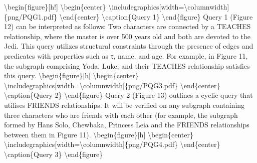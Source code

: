 \documentclass{article}%
\begin{document}
\textbackslash{}begin\{figure\}{[}h!{]}\newline%
\textbackslash{}begin\{center\}\newline%
\textbackslash{}includegraphics{[}width=\textbackslash{}columnwidth{]}\{png/PQG1.pdf\}\newline%
\textbackslash{}end\{center\}\newline%
\textbackslash{}caption\{Query 1\}\newline%
\textbackslash{}end\{figure\}\newline%
\newline%
Query 1 (Figure 12) can be interpreted as follows: Two characters are connected by a TEACHES relationship, where the master is over 500 years old and both are devoted to the Jedi. This query utilizes structural constraints through the presence of edges and predicates with properties such as τ, name, and age. For example, in Figure 11, the subgraph comprising Yoda, Luke, and their TEACHES relationship satisfies this query.\newline%
\newline%
\textbackslash{}begin\{figure\}{[}h{]}\newline%
\textbackslash{}begin\{center\}\newline%
\textbackslash{}includegraphics{[}width=\textbackslash{}columnwidth{]}\{png/PQG3.pdf\}\newline%
\textbackslash{}end\{center\}\newline%
\textbackslash{}caption\{Query 2\}\newline%
\textbackslash{}end\{figure\}\newline%
\newline%
Query 2 (Figure 13) outlines a cyclic query that utilises FRIENDS relationships. It will be verified on any subgraph containing three characters who are friends with each other (for example, the subgraph formed by Hans Solo, Chewbaka, Princess Leia and the FRIENDS relationships between them in Figure 11).\newline%
\newline%
\textbackslash{}begin\{figure\}{[}h{]}\newline%
\textbackslash{}begin\{center\}\newline%
\textbackslash{}includegraphics{[}width=\textbackslash{}columnwidth{]}\{png/PQG4.pdf\}\newline%
\textbackslash{}end\{center\}\newline%
\textbackslash{}caption\{Query 3\}\newline%
\textbackslash{}end\{figure\}\newline%
\end{document}
